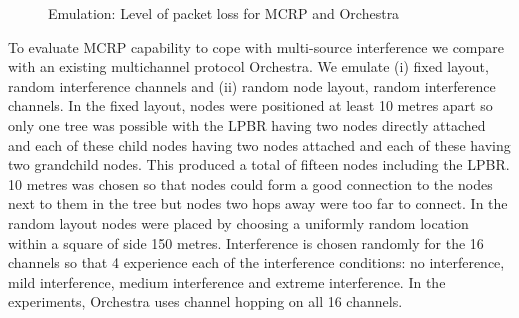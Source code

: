 \begin{figure}
\centering
{}
\caption{Emulation: Level of packet loss for MCRP and Orchestra}
\label{fig:layouts}
\end{figure}


To evaluate MCRP capability to cope with multi-source interference we compare with an existing multichannel protocol Orchestra.  We emulate (i) fixed layout, random interference channels and (ii) random node layout, random interference channels.
In the fixed layout, nodes were positioned at least 10 metres apart so  only one tree was possible with the LPBR having two nodes directly attached and each of these child nodes having two nodes attached and each of these having two grandchild nodes. This produced a total of fifteen nodes including the LPBR.  10 metres was chosen so that nodes could form a good connection to the nodes next to them in the tree but nodes two hops away were too far to connect. In the random layout nodes were placed by choosing a uniformly random location within a square of side 150 metres.
Interference is chosen randomly for the 16 channels so that 4 experience each of the interference conditions: no interference, mild interference, medium interference and extreme interference.  In the experiments, Orchestra uses channel hopping on all 16 channels. 


